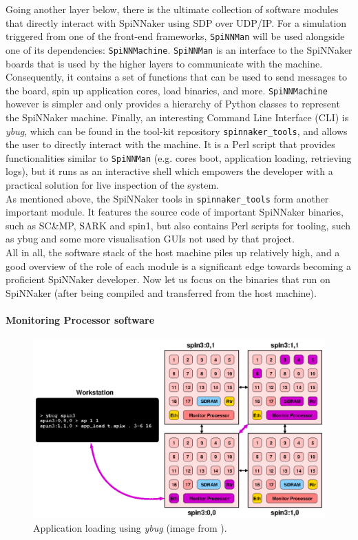 Going another layer below, there is the ultimate collection of software modules that directly interact with SpiNNaker using SDP over UDP/IP. For a simulation triggered from one of the front-end frameworks, \texttt{SpiNNMan} will be used alongside one of its dependencies: \texttt{SpiNNMachine}. \texttt{SpiNNMan} is an interface to the SpiNNaker boards that is used by the higher layers to communicate with the machine. Consequently, it contains a set of functions that can be used to send messages to the board, spin up application cores, load binaries, and more. \texttt{SpiNNMachine} however is simpler and only provides a hierarchy of Python classes to represent the SpiNNaker machine. Finally, an interesting Command Line Interface (CLI) is \textit{ybug}, which can be found in the tool-kit repository \texttt{spinnaker\_tools}, and allows the user to directly interact with the machine. It is a Perl script that provides functionalities similar to \texttt{SpiNNMan} (e.g. cores boot, application loading, retrieving logs), but it runs as an interactive shell which empowers the developer with a practical solution for live inspection of the system. \\

As mentioned above, the SpiNNaker tools in \texttt{spinnaker\_tools} form another important module. It features the source code of important SpiNNaker binaries, such as SC\&MP, SARK and spin1, but also contains Perl scripts for tooling, such as ybug and some more visualisation GUIs not used by that project. \\

All in all, the software stack of the host machine piles up relatively high, and a good overview of the role of each module is a significant edge towards becoming a proficient SpiNNaker developer. Now let us focus on the binaries that run on SpiNNaker (after being compiled and transferred from the host machine).


\paragraph{Monitoring Processor software}

\begin{figure}[hbtp]
\centering
\includegraphics[width = 1\hsize]{figures/ybug.png}
\caption{Application loading using \textit{ybug} (image from \cite{ybug}).} %
\label{fig:ybug}
\end{figure}

